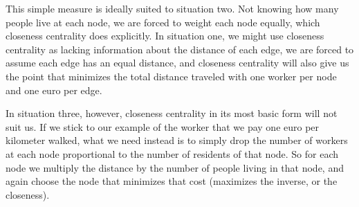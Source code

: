 \documentclass[a4paper,12pt]{article}
\begin{document}
This simple measure is ideally suited to situation two. Not knowing how many people live at each node, we are forced to weight each node equally, which closeness centrality does explicitly. In situation one, we might use closeness centrality as lacking information about the distance of each edge, we are forced to assume each edge has an equal distance, and closeness centrality will also give us the point that minimizes the total distance traveled with one worker per node and one euro per edge.

In situation three, however, closeness centrality in its most basic form will not suit us. If we stick to our example of the worker that we pay one euro per kilometer walked, what we need instead is to simply drop the number of workers at each node proportional to the number of residents of that node. So for each node we multiply the distance by the number of people living in that node, and again choose the node that minimizes that cost (maximizes the inverse, or the closeness).
\end{document}
